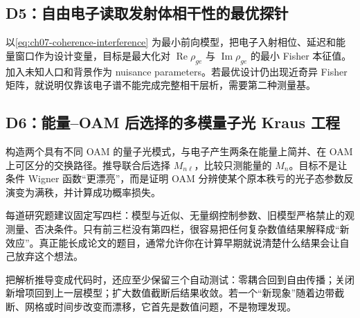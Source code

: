\subsection*{D5：自由电子读取发射体相干性的最优探针}
以\cref{eq:ch07-coherence-interference} 为最小前向模型，把电子入射相位、延迟和能量窗口作为设计变量，目标是最大化对 $\operatorname{Re}\rho_{ge}$ 与 $\operatorname{Im}\rho_{ge}$ 的最小 Fisher 本征值。加入未知人口和背景作为 nuisance parameters。若最优设计仍出现近奇异 Fisher 矩阵，就说明仅靠该电子谱不能完成完整相干层析，需要第二种测量基。

\subsection*{D6：能量--OAM 后选择的多模量子光 Kraus 工程}
构造两个具有不同 OAM 的量子光模式，与电子产生两条在能量上简并、在 OAM 上可区分的交换路径。推导联合后选择 $M_{n\ell}$，比较只测能量的 $M_n$。目标不是让条件 Wigner 函数“更漂亮”，而是证明 OAM 分辨使某个原本秩亏的光子态参数反演变为满秩，并计算成功概率损失。

\medskip
每道研究题建议固定写四栏：模型与近似、无量纲控制参数、旧模型严格禁止的观测量、否决条件。只有前三栏没有第四栏，很容易把任何复杂数值结果解释成“新效应”。真正能长成论文的题目，通常允许你在计算早期就说清楚什么结果会让自己放弃这个想法。

把解析推导变成代码时，还应至少保留三个自动测试：零耦合回到自由传播；关闭新增项回到上一层模型；扩大数值截断后结果收敛。若一个“新现象”随着边带截断、网格或时间步改变而漂移，它首先是数值问题，不是物理发现。
